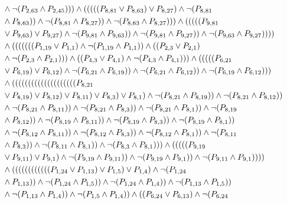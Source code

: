 \documentclass[10pt]{article}
\begin{document}
\begin{align*}
& \land \lnot(\PV{2,63} \land \PV{2,45}))) \land (((((\PV{8,81} \lor \PV{8,63}) \lor \PV{8,27}) \land \lnot(\PV{8,81} \\
& \land \PV{8,63})) \land \lnot(\PV{8,81} \land \PV{8,27})) \land \lnot(\PV{8,63} \land \PV{8,27}))) \land (((((\PV{9,81} \\
& \lor \PV{9,63}) \lor \PV{9,27}) \land \lnot(\PV{9,81} \land \PV{9,63})) \land \lnot(\PV{9,81} \land \PV{9,27})) \land \lnot(\PV{9,63} \land \PV{9,27})))) \\
& \land (((((((\PV{1,19} \lor \PV{1,1}) \land \lnot(\PV{1,19} \land \PV{1,1})) \land ((\PV{2,3} \lor \PV{2,1}) \\
& \land \lnot(\PV{2,3} \land \PV{2,1}))) \land ((\PV{4,3} \lor \PV{4,1}) \land \lnot(\PV{4,3} \land \PV{4,1}))) \land (((((\PV{6,21} \\
& \lor \PV{6,19}) \lor \PV{6,12}) \land \lnot(\PV{6,21} \land \PV{6,19})) \land \lnot(\PV{6,21} \land \PV{6,12})) \land \lnot(\PV{6,19} \land \PV{6,12}))) \\
& \land ((((((((((((((((((((\PV{8,21} \\
& \lor \PV{8,19}) \lor \PV{8,12}) \lor \PV{8,11}) \lor \PV{8,3}) \lor \PV{8,1}) \land \lnot(\PV{8,21} \land \PV{8,19})) \land \lnot(\PV{8,21} \land \PV{8,12})) \\
& \land \lnot(\PV{8,21} \land \PV{8,11})) \land \lnot(\PV{8,21} \land \PV{8,3})) \land \lnot(\PV{8,21} \land \PV{8,1})) \land \lnot(\PV{8,19} \\
& \land \PV{8,12})) \land \lnot(\PV{8,19} \land \PV{8,11})) \land \lnot(\PV{8,19} \land \PV{8,3})) \land \lnot(\PV{8,19} \land \PV{8,1})) \\
& \land \lnot(\PV{8,12} \land \PV{8,11})) \land \lnot(\PV{8,12} \land \PV{8,3})) \land \lnot(\PV{8,12} \land \PV{8,1})) \land \lnot(\PV{8,11} \\
& \land \PV{8,3})) \land \lnot(\PV{8,11} \land \PV{8,1})) \land \lnot(\PV{8,3} \land \PV{8,1}))) \land (((((\PV{9,19} \\
& \lor \PV{9,11}) \lor \PV{9,1}) \land \lnot(\PV{9,19} \land \PV{9,11})) \land \lnot(\PV{9,19} \land \PV{9,1})) \land \lnot(\PV{9,11} \land \PV{9,1})))) \\
& \land ((((((((((((\PV{1,24} \lor \PV{1,13}) \lor \PV{1,5}) \lor \PV{1,4}) \land \lnot(\PV{1,24} \\
& \land \PV{1,13})) \land \lnot(\PV{1,24} \land \PV{1,5})) \land \lnot(\PV{1,24} \land \PV{1,4})) \land \lnot(\PV{1,13} \land \PV{1,5})) \\
& \land \lnot(\PV{1,13} \land \PV{1,4})) \land \lnot(\PV{1,5} \land \PV{1,4})) \land ((\PV{6,24} \lor \PV{6,13}) \land \lnot(\PV{6,24} \\

\end{align*}
\end{document}
